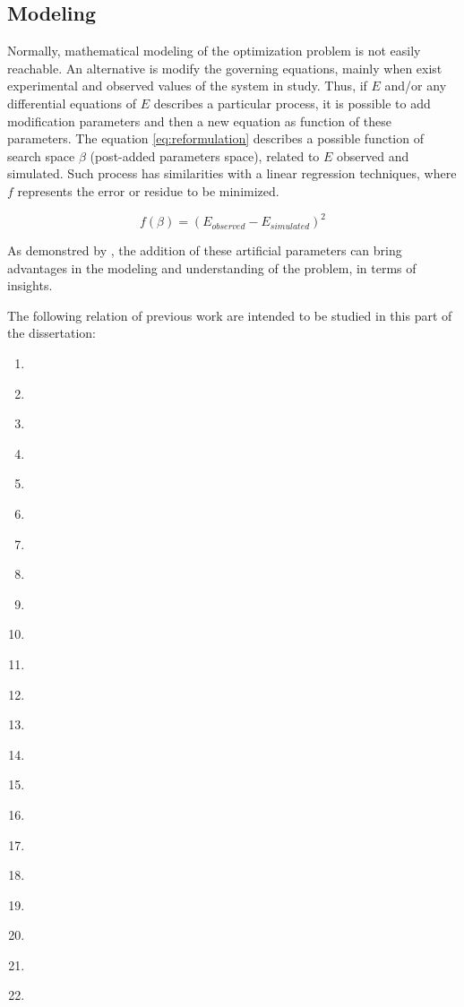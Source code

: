 \subsection{Modeling}
Normally, mathematical modeling of the optimization problem is not easily reachable. An alternative is modify the governing equations, mainly when exist experimental and observed values of the system in study. Thus, if $E$ and/or any differential equations of $E$ describes a particular process, it is possible to add modification parameters and then a new equation as function of these parameters. The equation \ref{eq:reformulation} describes a possible function of search space $\beta$ (post-added parameters space), related to $E$ observed and simulated. Such process has similarities with a linear regression techniques, where $f$ represents the error or residue to be minimized.

\begin{equation}
f(\beta) = \left(E_{observed} - E_{simulated}\right)^2
\label{eq:reformulation}
\end{equation}

As demonstred by \cite{Deb2012}, the addition of these artificial parameters can bring advantages in the modeling and understanding of the problem, in terms of insights. 

The following relation of previous work are intended to be studied in this part of the dissertation:
\begin{enumerate}
    \item \cite{Mengistu2004}
    \item \cite{Asgarshamsi2014}
    \item \cite{Thorn2016}
    \item \cite{Arabnia2009}
    \item \cite{Cervantes2018}
    \item \cite{Juangphanich2019}
    \item \cite{Juangphanich2017}
    \item \cite{Agromayor2019}
    \item \cite{NooriRahimAbadi2017}
    \item \cite{Aminyavari2016}
    \item \cite{Ba2019}
    \item \cite{Lonard2008}
    \item \cite{ksz2010}
    \item \cite{Arabnia2012}
    \item \cite{Jenkins1982}
    \item \cite{Jenkins1983}
    \item \cite{Cervantes2018thesis}
    \item \cite{Sivashanmugam2011}
    \item \cite{Mengistu2005}
    \item \cite{Amano2003}
    \item \cite{Rao2012}
    \item \cite{Deb2012}
\end{enumerate}

